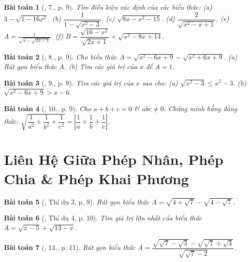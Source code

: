 \documentclass{article}
\newtheorem{baitoan}{Bài toán}
\begin{document}
\begin{baitoan}[\cite{Binh_Toan_9_tap_1}, 7., p. 9]
	Tìm điều kiện xác định của các biểu thức: (a) $3 - \sqrt{1 - 16x^2}$. (b) $\dfrac{1}{1 - \sqrt{x^2 - 3}}$. (c) $\sqrt{8x - x^2 - 15}$. (d) $\dfrac{2}{\sqrt{x^2 - x + 1}}$. (e) $A = \frac{1}{\sqrt{x - \sqrt{2x - 1}}}$. (f) $B = \dfrac{\sqrt{16 - x^2}}{\sqrt{2x + 1}} + \sqrt{x^2 - 8x + 14}$.
\end{baitoan}

\begin{baitoan}[\cite{Binh_Toan_9_tap_1}, 8., p. 9]
	Cho biểu thức $A = \sqrt{x^2 - 6x + 9} - \sqrt{x^2 + 6x + 9}$. (a) Rút gọn biểu thức $A$. (b) Tìm các giá trị của $x$ để $A = 1$.
\end{baitoan}

\begin{baitoan}[\cite{Binh_Toan_9_tap_1}, 9., p. 9]
	Tìm các giá trị của $x$ sao cho: (a) $\sqrt{x^2 - 3}\le x^2 - 3$. (b) $\sqrt{x^2 - 6x + 9} > x - 6$.
\end{baitoan}

\begin{baitoan}[\cite{Binh_Toan_9_tap_1}, 10., p. 9]
	Cho $a + b + c = 0$ \& $abc\ne0$. Chứng minh hằng đẳng thức: $\sqrt{\dfrac{1}{a^2} + \dfrac{1}{b^2} + \dfrac{1}{c^2}} = \left|\dfrac{1}{a} + \dfrac{1}{b} + \dfrac{1}{c}\right|$.
\end{baitoan}


\section{Liên Hệ Giữa Phép Nhân, Phép Chia \& Phép Khai Phương}

\begin{baitoan}[\cite{Tuyen_Toan_9}, Thí dụ 3, p. 9]
	Rút gọn biểu thức $A = \sqrt{4 + \sqrt{7}} - \sqrt{4 - \sqrt{7}}$.
\end{baitoan}

\begin{baitoan}[\cite{Tuyen_Toan_9}, Thí dụ 4, p. 10]
	Tìm giá trị lớn nhất của biểu thức $A = \sqrt{x - 5} + \sqrt{13 - x}$.
\end{baitoan}

\begin{baitoan}[\cite{Tuyen_Toan_9}, 14., p. 11]
	Rút gọn biểu thức $A = \dfrac{\sqrt{\sqrt{7} - \sqrt{3}} - \sqrt{\sqrt{7} + \sqrt{3}}}{\sqrt{\sqrt{7} - 2}}$.
\end{baitoan}
\end{document}
